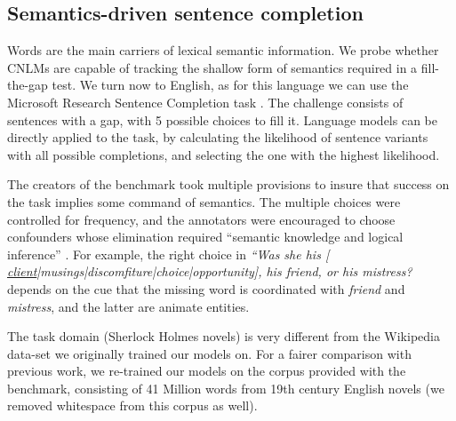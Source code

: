 \subsection{Semantics-driven sentence completion}
\label{sec:semantics}

Words are the main carriers of lexical semantic
information. We probe whether CNLMs are capable of tracking the shallow
form of semantics required in a fill-the-gap test. We turn now to English, as for this language we can use the Microsoft
Research Sentence Completion task \cite{Zweig:Burges:2011}. The
challenge consists of sentences with a gap, with 5 possible
choices to fill it. Language models can be
directly applied to the task, by calculating the likelihood of sentence
variants with all possible completions, and selecting the one with the
highest likelihood.

The creators of the benchmark took multiple provisions to insure that
success on the task implies some command of semantics. The multiple
choices were controlled for frequency, and the annotators were
encouraged to choose confounders whose elimination required ``semantic
knowledge and logical inference'' \cite{Zweig:Burges:2011}.  For
example, the right choice in \emph{``Was she his [
  \underline{client}|musings|discomfiture|choice|opportunity], his
  friend, or his mistress?} depends on the cue that the missing word is
coordinated with \emph{friend} and \emph{mistress}, and the
latter are animate entities.

The task domain (Sherlock Holmes novels) is very different
from the Wikipedia data-set we originally trained our models on. For a
fairer comparison with previous work, we re-trained our models on
the corpus provided with the benchmark, consisting of
41 Million words from 19th century English novels (we removed
whitespace from this corpus as well).

